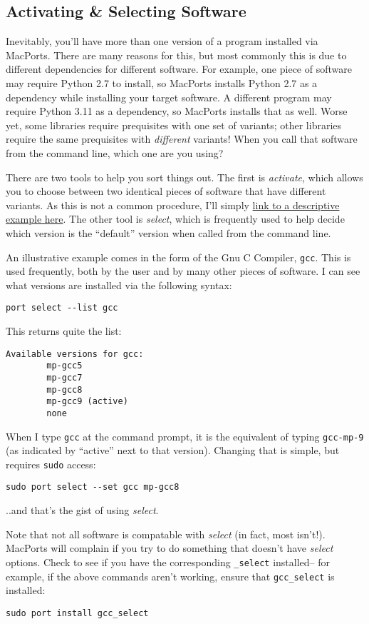 \documentclass[12pt, letterpaper]{article}
\begin{document}
\subsection{Activating \& Selecting Software}
Inevitably, you'll have more than one version of a program installed via
MacPorts.
There are many reasons for this, but most commonly this is due to different
dependencies for different software.  For example, one piece of software
may require Python 2.7 to install, so MacPorts installs Python 2.7 as a
dependency
while installing your target software.  A different program may require
Python 3.11
as a dependency, so MacPorts installs that as well.  Worse yet, some libraries
require prequisites with one set of variants; other libraries require the same
prequisites with \emph{different} variants!  When you call that software from
the command line, which one are you using?

There are two tools to help you sort things out.  The first is \emph{activate},
which allows you to choose between two identical pieces of software that have
different variants.  As this is not a common procedure, I'll simply
\href{https://guide.macports.org/#using.port.upgrade}{link to a descriptive
  example here}.  The other tool is \emph{select}, which is frequently used
to help decide which version is the ``default'' version when called from
the command line.

An illustrative example comes in the form of the Gnu C Compiler, {\tt gcc}.
This is used frequently, both by the user and by many other pieces of software.
I can see what versions are installed via the following syntax:
\begin{verbatim}
port select --list gcc
\end{verbatim}
This returns quite the list:
\begin{verbatim}
Available versions for gcc:
        mp-gcc5
        mp-gcc7
        mp-gcc8
        mp-gcc9 (active)
        none
\end{verbatim}
When I type {\tt gcc} at the command prompt, it is the equivalent of typing
{\tt gcc-mp-9} (as indicated by ``active'' next to that version).  Changing
that is simple, but requires {\tt sudo} access:
\begin{verbatim}
sudo port select --set gcc mp-gcc8
\end{verbatim}
..and that's the gist of using \emph{select}.

Note that not all software is compatable with \emph{select} (in fact, most
isn't!).  MacPorts will complain if you try to do something that doesn't have
\emph{select} options.  Check to see if you have the corresponding
{\tt \*\_select} installed-- for example, if the above commands aren't working,
ensure that {\tt gcc\_select} is installed:
\begin{verbatim}
sudo port install gcc_select
\end{verbatim}
\end{document}
